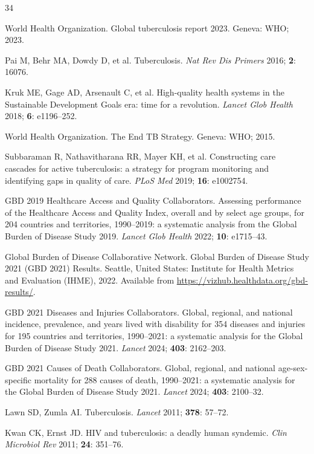 \documentclass[12pt]{article}
\begin{document}
\begin{thebibliography}{34}

World Health Organization. Global tuberculosis report 2023. Geneva: WHO; 2023.

Pai M, Behr MA, Dowdy D, et al. Tuberculosis. \textit{Nat Rev Dis Primers} 2016; \textbf{2}: 16076.

Kruk ME, Gage AD, Arsenault C, et al. High-quality health systems in the Sustainable Development Goals era: time for a revolution. \textit{Lancet Glob Health} 2018; \textbf{6}: e1196--252.

World Health Organization. The End TB Strategy. Geneva: WHO; 2015.

Subbaraman R, Nathavitharana RR, Mayer KH, et al. Constructing care cascades for active tuberculosis: a strategy for program monitoring and identifying gaps in quality of care. \textit{PLoS Med} 2019; \textbf{16}: e1002754.

GBD 2019 Healthcare Access and Quality Collaborators. Assessing performance of the Healthcare Access and Quality Index, overall and by select age groups, for 204 countries and territories, 1990--2019: a systematic analysis from the Global Burden of Disease Study 2019. \textit{Lancet Glob Health} 2022; \textbf{10}: e1715--43.

Global Burden of Disease Collaborative Network. Global Burden of Disease Study 2021 (GBD 2021) Results. Seattle, United States: Institute for Health Metrics and Evaluation (IHME), 2022. Available from \url{https://vizhub.healthdata.org/gbd-results/}.

GBD 2021 Diseases and Injuries Collaborators. Global, regional, and national incidence, prevalence, and years lived with disability for 354 diseases and injuries for 195 countries and territories, 1990--2021: a systematic analysis for the Global Burden of Disease Study 2021. \textit{Lancet} 2024; \textbf{403}: 2162--203.

GBD 2021 Causes of Death Collaborators. Global, regional, and national age-sex-specific mortality for 288 causes of death, 1990--2021: a systematic analysis for the Global Burden of Disease Study 2021. \textit{Lancet} 2024; \textbf{403}: 2100--32.

Lawn SD, Zumla AI. Tuberculosis. \textit{Lancet} 2011; \textbf{378}: 57--72.

Kwan CK, Ernst JD. HIV and tuberculosis: a deadly human syndemic. \textit{Clin Microbiol Rev} 2011; \textbf{24}: 351--76.


\end{thebibliography}
\end{document}
